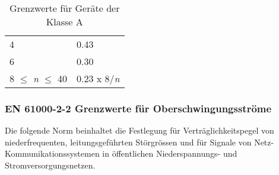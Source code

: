 \begin{table}[ht!]
\begin{tabular}{|l|l|}
		4                                            & 0.43                                                                                                                \\
		6                                            & 0.30                                                                                                                \\
		8 $\leq$ \textit{n} $\leq$ 40                & 0.23 x 8/\textit{n}                                                                                                 \\ \hline
	\end{tabular}
\caption{Grenzwerte für Geräte der Klasse A}\label{tab:Grenzwerte_Normen}
\end{table}





\subsubsection{EN 61000-2-2 Grenzwerte für Oberschwingungsströme}

Die folgende Norm beinhaltet die Festlegung für Verträglichkeitspegel von niederfrequenten, leitungsgeführten Störgrössen und für Signale von Netz-Kommunikationssystemen in öffentlichen Niederspannungs- und Stromversorgungsnetzen. 

